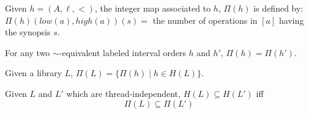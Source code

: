 Given $h=(A,\ell,<)$, the integer map associated to $h$, $\Pi(h)$ is defined
by: $\Pi(h)(low(a),high(a))(s)=$ the number of operations in $[a]$ having the
synopsis $s$.

\begin{lemma}

  For any two $\sim$-equivalent labeled interval orders $h$ and $h'$,
  $\Pi(h)=\Pi(h')$.

\end{lemma}

Given a library $L$, $\Pi(L)=\{\Pi(h)\mid h\in H(L)\}$.

\begin{lemma}

  Given $L$ and $L'$ which are thread-independent, $H(L)\subseteq H(L')$ iff
  \[
    \Pi(L) \subseteq \Pi(L')
  \]

\end{lemma}
